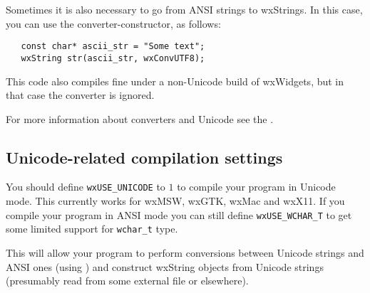 Sometimes it is also necessary to go from ANSI strings to wxStrings.  
In this case, you can use the converter-constructor, as follows:
 
\begin{verbatim}
   const char* ascii_str = "Some text";
   wxString str(ascii_str, wxConvUTF8);
\end{verbatim}

This code also compiles fine under a non-Unicode build of wxWidgets,
but in that case the converter is ignored.

For more information about converters and Unicode see
the .


\subsection{Unicode-related compilation settings}\label{unicodesettings}

You should define {\tt wxUSE\_UNICODE} to $1$ to compile your program in
Unicode mode. This currently works for wxMSW, wxGTK, wxMac and wxX11. If you
compile your program in ANSI mode you can still define {\tt wxUSE\_WCHAR\_T} 
to get some limited support for {\tt wchar\_t} type.

This will allow your program to perform conversions between Unicode strings and
ANSI ones (using ) 
and construct wxString objects from Unicode strings (presumably read
from some external file or elsewhere).

